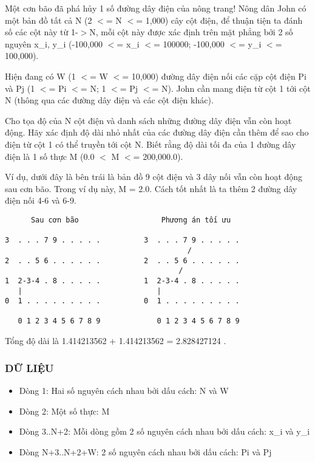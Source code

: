 



   Một cơn bão đã phá hủy 1 số đường dây điện của nông trang! Nông dân  John có một bản đồ tất cả N (2 $<$= N $<$= 1,000) cây cột điện, để thuận tiện ta đánh số các cột này từ 1-$>$N, mỗi cột này được xác định  trên mặt phẳng bởi 2 số nguyên x\_i,  y\_i (-100,000 $<$= x\_i $<$= 100000; -100,000 $<$= y\_i $<$= 100,000).  

   Hiện đang có W (1 $<$= W $<$= 10,000) đường dây điện nối các cặp cột điện  Pi và Pj (1 $<$= Pi $<$= N; 1 $<$= Pj $<$= N).  John cần mang điện từ cột 1 tới cột N (thông qua các đường dây điện và  các cột điện khác).  

   Cho tọa độ của N cột điện và danh sách những đường dây điện vẫn còn hoạt  động. Hãy xác định độ dài nhỏ nhất của các đường dây điện cần thêm để sao  cho điện từ cột 1 có thể truyền tới cột N. Biết rằng độ dài tối đa của  1 đường dây điện là 1 số thực M (0.0 $<$ M $<$= 200,000.0).  

   Ví dụ, dưới đây là bên trái là bản đồ 9 cột điện và 3 dây nối vẫn còn hoạt động sau cơn bão. Trong ví dụ này, M = 2.0. Cách tốt nhất là ta thêm 2 đường dây điện nối 4-6 và 6-9.  
\begin{verbatim}
      Sau cơn bão                   Phương án tối ưu

3  . . . 7 9 . . . . .          3  . . . 7 9 . . . . .
                                          /
2  . . 5 6 . . . . . .          2  . . 5 6 . . . . . .
                                        /
1  2-3-4 . 8 . . . . .          1  2-3-4 . 8 . . . . .
   |                               |
0  1 . . . . . . . . .          0  1 . . . . . . . . .

   0 1 2 3 4 5 6 7 8 9             0 1 2 3 4 5 6 7 8 9
\end{verbatim}

   Tổng độ dài là 1.414213562 + 1.414213562 = 2.828427124 .  

\subsubsection{   DỮ LIỆU  }
\begin{itemize}
	\item     Dòng 1: Hai số nguyên cách nhau bởi dấu cách: N và W   
	\item     Dòng 2: Một số thực: M   
	\item     Dòng 3..N+2: Mỗi dòng gồm 2 số nguyên cách nhau bởi dấu cách: x\_i         và y\_i   
	\item     Dòng N+3..N+2+W: 2 số nguyên cách nhau bởi dấu cách: Pi và Pj   
\end{itemize}

